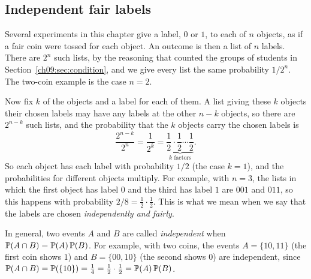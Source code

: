 \subsection*{Independent fair labels}
Several experiments in this chapter give a label, $0$ or $1$, to each of $n$ objects, as if a fair coin were tossed for each object. An outcome is then a list of $n$ labels. There are $2^n$ such lists, by the reasoning that counted the groups of students in Section~\ref{ch09:sec:condition}, and we give every list the same probability $1/2^n$. The two-coin example is the case $n=2$.

Now fix $k$ of the objects and a label for each of them. A list giving these $k$ objects their chosen labels may have any labels at the other $n-k$ objects, so there are $2^{n-k}$ such lists, and the probability that the $k$ objects carry the chosen labels is
\[
\frac{2^{n-k}}{2^n}=\frac1{2^k}=\underbrace{\frac12\cdot\frac12\cdots\frac12}_{k\text{ factors}}.
\]
So each object has each label with probability $1/2$ (the case $k=1$), and the probabilities for different objects multiply. For example, with $n=3$, the lists in which the first object has label $0$ and the third has label $1$ are $001$ and $011$, so this happens with probability $2/8=\tfrac12\cdot\tfrac12$. This is what we mean when we say that the labels are chosen \emph{independently and fairly}.

In general, two events $A$ and $B$ are called \emph{independent} when $\operatorname{\mathbb P}(A\cap B)=\operatorname{\mathbb P}(A)\operatorname{\mathbb P}(B)$. For example, with two coins, the events $A=\{10,11\}$ (the first coin shows $1$) and $B=\{00,10\}$ (the second shows $0$) are independent, since $\operatorname{\mathbb P}(A\cap B)=\operatorname{\mathbb P}(\{10\})=\tfrac14=\tfrac12\cdot\tfrac12=\operatorname{\mathbb P}(A)\operatorname{\mathbb P}(B)$.
